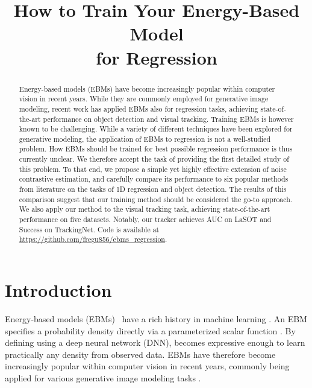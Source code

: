 \documentclass{bmvc2k}
\title{How to Train Your Energy-Based Model\\ for Regression}
\begin{document}
\maketitle

\begin{abstract}
Energy-based models (EBMs) have become increasingly popular within computer vision in recent years. While they are commonly employed for generative image modeling, recent work has applied EBMs also for regression tasks, achieving state-of-the-art performance on object detection and visual tracking. Training EBMs is however known to be challenging. While a variety of different techniques have been explored for generative modeling, the application of EBMs to regression is not a well-studied problem. How EBMs should be trained for best possible regression performance is thus currently unclear. We therefore accept the task of providing the first detailed study of this problem. To that end, we propose a simple yet highly effective extension of noise contrastive estimation, and carefully compare its performance to six popular methods from literature on the tasks of 1D regression and object detection. The results of this comparison suggest that our training method should be considered the go-to approach. We also apply our method to the visual tracking task, achieving state-of-the-art performance on five datasets. Notably, our tracker achieves  AUC on LaSOT and  Success on TrackingNet. Code is available at \url{https://github.com/fregu856/ebms_regression}. 
\end{abstract}






\section{Introduction}
\label{section:introduction}
Energy-based models (EBMs)~\cite{lecun2006tutorial} have a rich history in machine learning \cite{teh2003energy, bengio2003neural, mnih2005learning, hinton2006unsupervised, osadchy2005synergistic}. An EBM specifies a probability density  directly via a parameterized scalar function . By defining  using a deep neural network (DNN),  becomes expressive enough to learn practically any density from observed data. EBMs have therefore become increasingly popular within computer vision in recent years, commonly being applied for various generative image modeling tasks \cite{xie2016theory, gao2018learning, nijkamp2019learning, du2019implicit, Grathwohl2020Your, nijkamp2019anatomy, gao2019flow}. 
\end{document}
